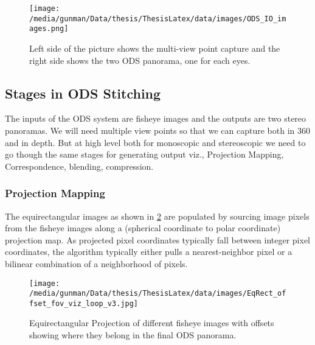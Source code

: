 \begin{figure}[h]
	\begin{center}
		\texttt{[image: /media/gunman/Data/thesis/ThesisLatex/data/images/ODS\_IO\_images.png]}
	\end{center}
		\caption{Left side of the picture shows the multi-view point capture and the right side shows the two ODS panorama, one for each eyes.}	
\label{fig:ODS_IO}
\end{figure} 

\subsection{Stages in ODS Stitching}
The inputs of the ODS system are fisheye images and the outputs are two stereo panoramas. We will need multiple view points so that we can capture both in 360 and in depth. But at high level both for monoscopic and stereoscopic we need to go though the same stages for generating output viz., Projection Mapping, Correspondence, blending, compression.
\subsubsection{Projection Mapping}The equirectangular images as shown in \ref{fig:ODS_Proj} are populated by sourcing image pixels from the fisheye images along a (spherical coordinate to polar coordinate) projection map. As projected pixel coordinates typically fall between integer pixel coordinates, the algorithm typically either pulls a nearest-neighbor pixel or a bilinear combination of a neighborhood of pixels. 
\begin{figure}[h]
	\begin{center}
		\texttt{[image: /media/gunman/Data/thesis/ThesisLatex/data/images/EqRect\_offset\_fov\_viz\_loop\_v3.jpg]}
		\caption{Equirectangular Projection of different fisheye images with offsets showing where they belong in the final ODS panorama.}
		\label{fig:ODS_Proj}
	\end{center}
\end{figure} 

